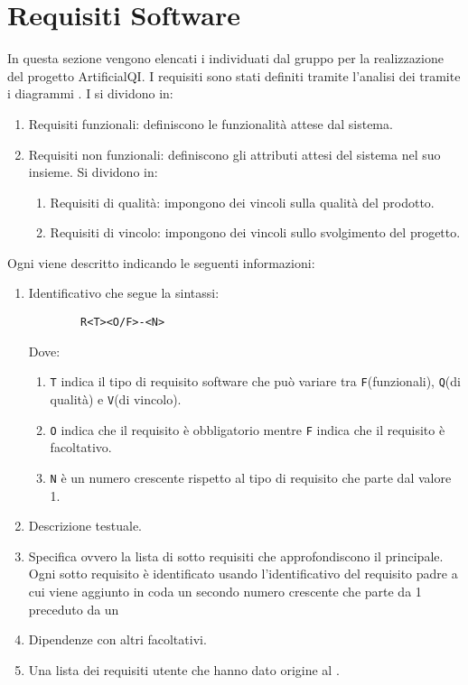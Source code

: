 \section{Requisiti Software}
\label{sec:requisiti_software}
In questa sezione vengono elencati i  individuati dal gruppo per la realizzazione del progetto ArtificialQI.
I requisiti sono stati definiti tramite l'analisi dei  tramite i diagrammi .
I  si dividono in:
\begin{enumerate}
    \label{en:req_type}
    \item Requisiti funzionali: definiscono le funzionalità attese dal sistema.
    \item Requisiti non funzionali: definiscono gli attributi attesi del sistema nel suo insieme.
    Si dividono in:
    \begin{enumerate}
        \item Requisiti di qualità: impongono dei vincoli sulla qualità del prodotto.
        \item Requisiti di vincolo: impongono dei vincoli sullo svolgimento del progetto.
    \end{enumerate}
\end{enumerate}
Ogni  viene descritto indicando le seguenti informazioni:
\begin{enumerate}
    \item Identificativo che segue la sintassi:
    \begin{lstlisting}
        R<T><O/F>-<N>
    \end{lstlisting}
    Dove:
    \begin{enumerate}
        \item \lstinline{T} indica il tipo di requisito software che può variare tra \lstinline{F}(funzionali), \lstinline{Q}(di qualità) e \lstinline{V}(di vincolo).
        \item \lstinline{O} indica che il requisito è obbligatorio mentre \lstinline{F} indica che il requisito è facoltativo.
        \item \lstinline{N} è un numero crescente rispetto al tipo di requisito che parte dal valore 1.
    \end{enumerate}
    \item Descrizione testuale.
    \item Specifica ovvero la lista di sotto requisiti che approfondiscono il  principale.
    Ogni sotto requisito è identificato usando l'identificativo del requisito padre a cui viene aggiunto in coda un secondo numero crescente che parte da 1 preceduto da un
    \item Dipendenze con altri  facoltativi.
    \item Una lista dei requisiti utente che hanno dato origine al .
\end{enumerate}




